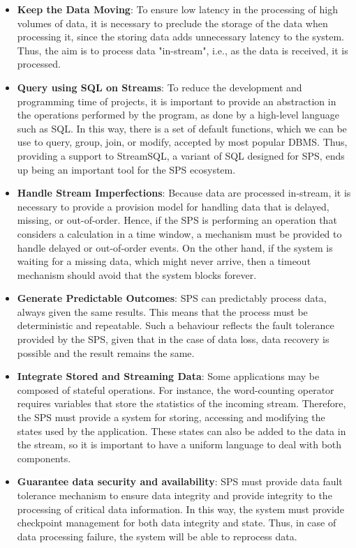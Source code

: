 \begin{itemize}
		\item \textbf{Keep the Data Moving}: To ensure low latency in the processing of high volumes of data, it is necessary to preclude the storage of the data when processing it, since the storing data adds unnecessary latency to the system. Thus, the aim is to process data "in-stream", i.e., as the data is received, it is processed.
        \item \textbf{Query using SQL on Streams}: To reduce the development and programming time of projects, it is important to provide an abstraction in the operations performed by the program, as done by a high-level language such as SQL. In this way, there is a set of default functions, which we can be use to query, group, join, or modify, accepted by most popular DBMS. Thus, providing a support to  StreamSQL, a variant of SQL designed for SPS, ends up being an important tool for the SPS ecosystem.
        \item \textbf{Handle Stream Imperfections}: Because data are processed in-stream, it is necessary to provide a provision model for handling data that is delayed, missing, or out-of-order. Hence, if the SPS is performing an operation that considers a calculation in a time window, a mechanism must be provided to handle delayed or out-of-order events. On the other hand, if the system is waiting for a missing data, which might never arrive, then a timeout mechanism should avoid that the system blocks forever.		        
        \item \textbf{Generate Predictable Outcomes}: SPS can predictably process data, always given the same results. This means that the process must be deterministic and repeatable. Such a behaviour reflects the fault tolerance provided by the SPS, given that in the case of data loss, data recovery is possible and the result remains the same.
		\item \textbf{Integrate Stored and Streaming Data}: Some applications may be composed of stateful operations. For instance, the word-counting operator requires variables that store the statistics of the incoming stream. Therefore, the SPS must provide a system for storing, accessing and modifying the states used by the application. These states can also be added to the data in the stream, so it is important to
have a uniform language to deal with both components.
        \item \textbf{Guarantee data security and availability}: SPS must provide data fault tolerance mechanism to ensure data integrity and provide integrity to the processing of critical data information. In this way, the system must provide checkpoint management for both data integrity and state. Thus, in case of data processing failure, the system will be able to reprocess data. 

\end{itemize}
